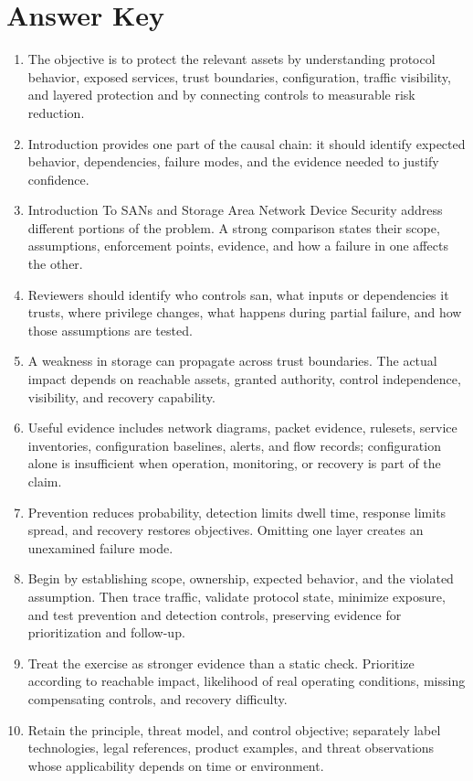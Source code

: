 \documentclass[11pt,letterpaper]{article}
\begin{document}
\section*{Answer Key}
\begin{enumerate}
\item The objective is to protect the relevant assets by understanding protocol behavior, exposed services, trust boundaries, configuration, traffic visibility, and layered protection and by connecting controls to measurable risk reduction.
\item Introduction provides one part of the causal chain: it should identify expected behavior, dependencies, failure modes, and the evidence needed to justify confidence.
\item Introduction To SANs and Storage Area Network Device Security address different portions of the problem. A strong comparison states their scope, assumptions, enforcement points, evidence, and how a failure in one affects the other.
\item Reviewers should identify who controls san, what inputs or dependencies it trusts, where privilege changes, what happens during partial failure, and how those assumptions are tested.
\item A weakness in storage can propagate across trust boundaries. The actual impact depends on reachable assets, granted authority, control independence, visibility, and recovery capability.
\item Useful evidence includes network diagrams, packet evidence, rulesets, service inventories, configuration baselines, alerts, and flow records; configuration alone is insufficient when operation, monitoring, or recovery is part of the claim.
\item Prevention reduces probability, detection limits dwell time, response limits spread, and recovery restores objectives. Omitting one layer creates an unexamined failure mode.
\item Begin by establishing scope, ownership, expected behavior, and the violated assumption. Then trace traffic, validate protocol state, minimize exposure, and test prevention and detection controls, preserving evidence for prioritization and follow-up.
\item Treat the exercise as stronger evidence than a static check. Prioritize according to reachable impact, likelihood of real operating conditions, missing compensating controls, and recovery difficulty.
\item Retain the principle, threat model, and control objective; separately label technologies, legal references, product examples, and threat observations whose applicability depends on time or environment.
\end{enumerate}
\end{document}
